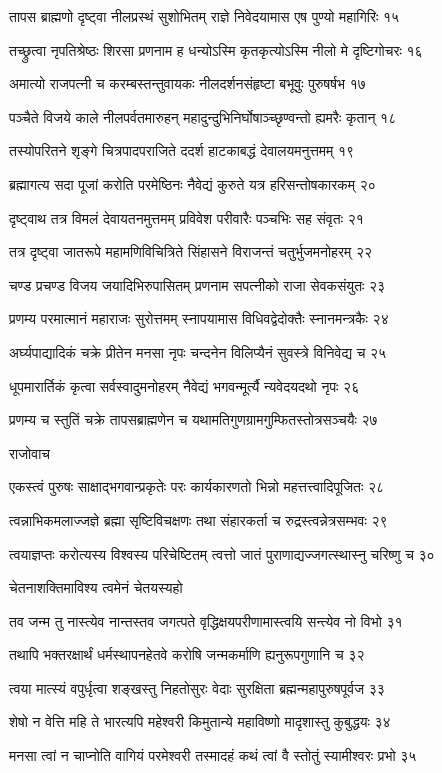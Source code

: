 तापस ब्राह्मणो दृष्ट्वा नीलप्रस्थं सुशोभितम्
राज्ञे निवेदयामास एष पुण्यो महागिरिः १५

तच्छ्रुत्वा नृपतिश्रेष्ठः शिरसा प्रणनाम ह
धन्योऽस्मि कृतकृत्योऽस्मि नीलो मे दृष्टिगोचरः १६

अमात्यो राजपत्नी च करम्बस्तन्तुवायकः
नीलदर्शनसंहृष्टा बभूवुः पुरुषर्षभ १७

पञ्चैते विजये काले नीलपर्वतमारुहन्
महादुन्दुभिनिर्घोषाञ्च्छृण्वन्तो ह्यमरैः कृतान् १८

तस्योपरितने शृङ्गे चित्रपादपराजिते
ददर्श हाटकाबद्धं देवालयमनुत्तमम् १९

ब्रह्मागत्य सदा पूजां करोति परमेष्ठिनः
नैवेद्यं कुरुते यत्र हरिसन्तोषकारकम् २०

दृष्ट्वाथ तत्र विमलं देवायतनमुत्तमम्
प्रविवेश परीवारैः पञ्चभिः सह संवृतः २१

तत्र दृष्ट्वा जातरूपे महामणिविचित्रिते
सिंहासने विराजन्तं चतुर्भुजमनोहरम् २२

चण्ड प्रचण्ड विजय जयादिभिरुपासितम्
प्रणनाम सपत्नीको राजा सेवकसंयुतः २३

प्रणम्य परमात्मानं महाराजः सुरोत्तमम्
स्नापयामास विधिवद्वेदोक्तैः स्नानमन्त्रकैः २४

अर्घ्यपाद्यादिकं चक्रे प्रीतेन मनसा नृपः
चन्दनेन विलिप्यैनं सुवस्त्रे विनिवेद्य च २५

धूपमारार्तिकं कृत्वा सर्वस्वादुमनोहरम्
नैवेद्यं भगवन्मूर्त्यै न्यवेदयदथो नृपः २६

प्रणम्य च स्तुतिं चक्रे तापसब्राह्मणेन च
यथामतिगुणग्रामगुम्फितस्तोत्रसञ्चयैः २७

राजोवाच

एकस्त्वं पुरुषः साक्षाद्भगवान्प्रकृतेः परः
कार्यकारणतो भिन्नो महत्तत्त्वादिपूजितः २८

त्वन्नाभिकमलाज्जज्ञे ब्रह्मा सृष्टिविचक्षणः
तथा संहारकर्ता च रुद्रस्त्वन्नेत्रसम्भवः २९

त्वयाज्ञप्तः करोत्यस्य विश्वस्य परिचेष्टितम्
त्वत्तो जातं पुराणाद्यज्जगत्स्थास्नु चरिष्णु च ३०

चेतनाशक्तिमाविश्य त्वमेनं चेतयस्यहो

तव जन्म तु नास्त्येव नान्तस्तव जगत्पते
वृद्धिक्षयपरीणामास्त्वयि सन्त्येव नो विभो ३१

तथापि भक्तरक्षार्थं धर्मस्थापनहेतवे
करोषि जन्मकर्माणि ह्यनुरूपगुणानि च ३२

त्वया मात्स्यं वपुर्धृत्वा शङ्खस्तु निहतोसुरः
वेदाः सुरक्षिता ब्रह्मन्महापुरुषपूर्वज ३३

शेषो न वेत्ति महि ते भारत्यपि महेश्वरी
किमुतान्ये महाविष्णो मादृशास्तु कुबुद्धयः ३४

मनसा त्वां न चाप्नोति वागियं परमेश्वरी
तस्मादहं कथं त्वां वै स्तोतुं स्यामीश्वरः प्रभो ३५

